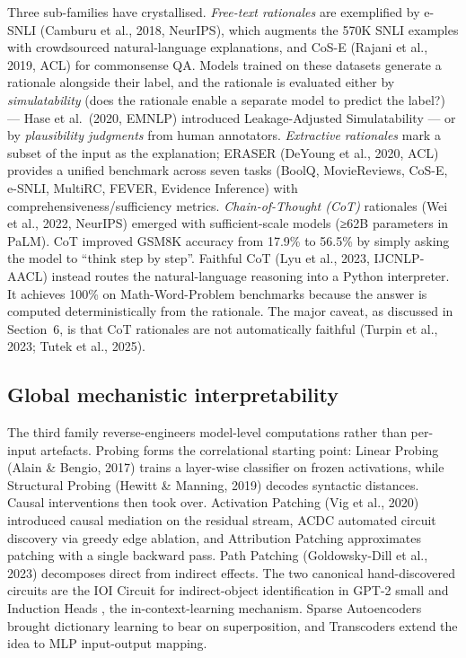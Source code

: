 \documentclass{article}
\begin{document}
Three sub-families have crystallised. \emph{Free-text rationales} are exemplified by e-SNLI (Camburu et al., 2018, NeurIPS), which augments the 570K SNLI examples with crowdsourced natural-language explanations, and CoS-E (Rajani et al., 2019, ACL) for commonsense QA. Models trained on these datasets generate a rationale alongside their label, and the rationale is evaluated either by \emph{simulatability} (does the rationale enable a separate model to predict the label?) --- Hase et al.~(2020, EMNLP) introduced Leakage-Adjusted Simulatability --- or by \emph{plausibility judgments} from human annotators. \emph{Extractive rationales} mark a subset of the input as the explanation; ERASER (DeYoung et al., 2020, ACL) provides a unified benchmark across seven tasks (BoolQ, MovieReviews, CoS-E, e-SNLI, MultiRC, FEVER, Evidence Inference) with comprehensiveness/sufficiency metrics. \emph{Chain-of-Thought (CoT)} rationales (Wei et al., 2022, NeurIPS) emerged with sufficient-scale models (≥62B parameters in PaLM). CoT improved GSM8K accuracy from 17.9\% to 56.5\% by simply asking the model to ``think step by step''. Faithful CoT (Lyu et al., 2023, IJCNLP-AACL) instead routes the natural-language reasoning into a Python interpreter. It achieves 100\% on Math-Word-Problem benchmarks because the answer is computed deterministically from the rationale. The major caveat, as discussed in Section~6, is that CoT rationales are not automatically faithful (Turpin et al., 2023; Tutek et al., 2025).

\subsection{Global mechanistic interpretability}\label{global-mechanistic-interpretability}

The third family reverse-engineers model-level computations rather than per-input artefacts. Probing forms the correlational starting point: Linear Probing (Alain \& Bengio, 2017) trains a layer-wise classifier on frozen activations, while Structural Probing (Hewitt \& Manning, 2019) decodes syntactic distances. Causal interventions then took over. Activation Patching (Vig et al., 2020) introduced causal mediation on the residual stream, ACDC \citep{conmy2023towardsautomatedci} automated circuit discovery via greedy edge ablation, and Attribution Patching \citep{syed2024attributionpatchin} approximates patching with a single backward pass. Path Patching (Goldowsky-Dill et al., 2023) decomposes direct from indirect effects. The two canonical hand-discovered circuits are the IOI Circuit \citep{wang2022interpretabilityin} for indirect-object identification in GPT-2 small and Induction Heads \citep{olsson2022incontextlearninga}, the in-context-learning mechanism. Sparse Autoencoders \citep{cunningham2023sparseautoencoders} brought dictionary learning to bear on superposition, and Transcoders \citep{dunefsky2025oneshotoptimizedst} extend the idea to MLP input-output mapping.
\end{document}
